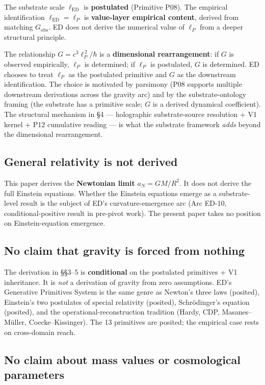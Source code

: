 \documentclass[11pt,a4paper]{article}
\begin{document}
The substrate scale $\ell_\mathrm{ED}$ is \textbf{postulated} (Primitive P08). The empirical identification $\ell_\mathrm{ED} = \ell_P$ is \textbf{value-layer empirical content}, derived from matching $G_\mathrm{obs}$. ED does not derive the numerical value of $\ell_P$ from a deeper structural principle.

The relationship $G = c^3\ell_P^{\,2}/\hbar$ is a \textbf{dimensional rearrangement}: if $G$ is observed empirically, $\ell_P$ is determined; if $\ell_P$ is postulated, $G$ is determined. ED chooses to treat $\ell_P$ as the postulated primitive and $G$ as the downstream identification. The choice is motivated by parsimony (P08 supports multiple downstream derivations across the gravity arc) and by the substrate-ontology framing (the substrate has a primitive scale; $G$ is a derived dynamical coefficient). The structural mechanism in \S4 --- holographic substrate-source resolution + V1 kernel + P12 cumulative reading --- is what the substrate framework \emph{adds} beyond the dimensional rearrangement.

\subsection{General relativity is not derived}

This paper derives the \textbf{Newtonian limit} $a_N = GM/R^2$. It does not derive the full Einstein equations. Whether the Einstein equations emerge as a substrate-level result is the subject of ED's curvature-emergence arc (Arc ED-10, conditional-positive result in pre-pivot work). The present paper takes no position on Einstein-equation emergence.

\subsection{No claim that gravity is forced from nothing}

The derivation in \S\S3--5 is \textbf{conditional} on the postulated primitives + V1 inheritance. It is \emph{not} a derivation of gravity from zero assumptions. ED's Generative Primitives System is the same genre as Newton's three laws (posited), Einstein's two postulates of special relativity (posited), Schr\"odinger's equation (posited), and the operational-reconstruction tradition (Hardy, CDP, Masanes--M\"uller, Coecke--Kissinger). The 13 primitives are posited; the empirical case rests on cross-domain reach.

\subsection{No claim about mass values or cosmological parameters}
\end{document}
